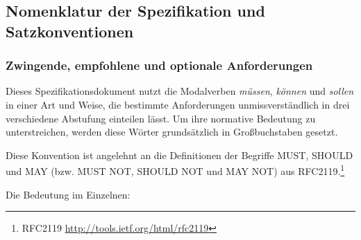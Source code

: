 \documentclass[,a4paper]{article}
\begin{document}
\subsection{Nomenklatur der Spezifikation und
Satzkonventionen}\label{nomenklatur-der-spezifikation-und-satzkonventionen}

\subsubsection{Zwingende, empfohlene und optionale
Anforderungen}\label{mussux5fsollux5fdarf}

Dieses Spezifikationsdokument nutzt die Modalverben \emph{müssen},
\emph{können} und \emph{sollen} in einer Art und Weise, die bestimmte
Anforderungen unmissverständlich in drei verschiedene Abstufung
einteilen lässt. Um ihre normative Bedeutung zu unterstreichen, werden
diese Wörter grundsätzlich in Großbuchstaben gesetzt.

Diese Konvention ist angelehnt an die Definitionen der Begriffe MUST,
SHOULD und MAY (bzw. MUST NOT, SHOULD NOT und MAY NOT) aus
RFC2119.\footnote{RFC2119 \url{http://tools.ietf.org/html/rfc2119}}

Die Bedeutung im Einzelnen:
\end{document}
